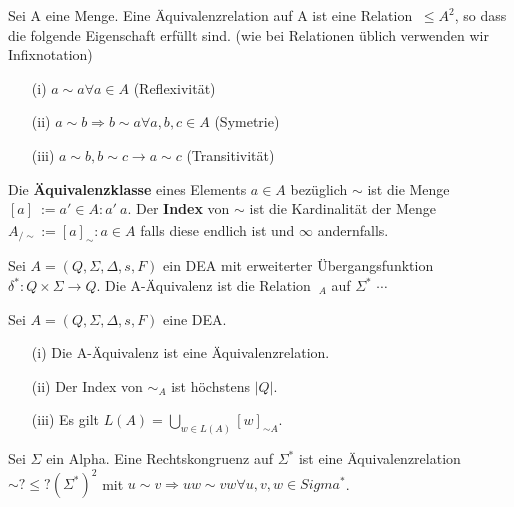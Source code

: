 
 Sei A eine Menge. Eine Äquivalenzrelation auf A ist eine Relation $~ \leq A^{2}$, so dass die folgende Eigenschaft erfüllt sind. (wie bei Relationen üblich verwenden wir Infixnotation)
\begin{itemize}
    \item [(i)] $a \sim a \forall a \in A $ (Reflexivität)
    \item [(ii)] $a \sim b \Rightarrow  b \sim a \forall a, b, c \in A$ (Symetrie)
    \item [(iii)] $a \sim b, b \sim c \rightarrow a \sim c$ (Transitivität)
\end{itemize}
Die \textbf{Äquivalenzklasse} eines Elements $a \in A$ bezüglich $\sim$ ist die Menge $[a]_{~} := {a' \in A : a' ~a}$. Der \textbf{Index} von $\sim$ ist die Kardinalität der Menge $A_{/\sim} := {[a]_{\sim} : a \in A}$ falls diese endlich ist und $\infty$  andernfalls.

 Sei $A = (Q, \Sigma, \Delta, s, F)$ ein DEA mit erweiterter Übergangsfunktion 
$\delta^{*}: Q \times \Sigma \rightarrow Q$. Die A-Äquivalenz ist die Relation $~_A$ auf $\Sigma^{*}$
$\cdots$

 Sei $A = (Q, \Sigma, \Delta, s, F)$ eine DEA.
\begin{itemize}
    \item [(i)] Die A-Äquivalenz ist eine Äquivalenzrelation.
    \item [(ii)] Der Index von $\sim_{A}$ ist höchstens $|Q|$.
    \item [(iii)] Es gilt $L(A) = \bigcup \limits_{w \in L(A)} [w]_{\sim A}$.
\end{itemize}

 Sei $\Sigma$ ein Alpha. Eine Rechtskongruenz auf $\Sigma^{*}$ ist eine Äquivalenzrelation $\sim ?\leq ?(\Sigma^{*})^{2}$ mit $u \sim v \Rightarrow uw \sim vw \forall u, v, w \in Sigma^{*}$.

